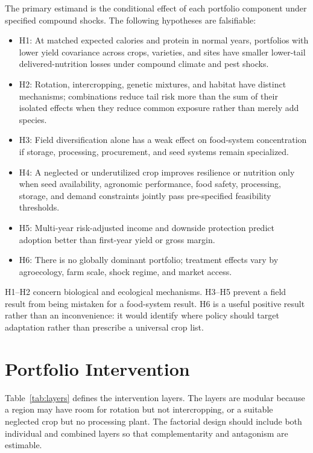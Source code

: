 \documentclass[conference]{IEEEtran}
\begin{document}
The primary estimand is the conditional effect of each portfolio component under specified compound shocks. The following hypotheses are falsifiable:

\begin{itemize}
\item H1: At matched expected calories and protein in normal years, portfolios with lower yield covariance across crops, varieties, and sites have smaller lower-tail delivered-nutrition losses under compound climate and pest shocks.
\item H2: Rotation, intercropping, genetic mixtures, and habitat have distinct mechanisms; combinations reduce tail risk more than the sum of their isolated effects when they reduce common exposure rather than merely add species.
\item H3: Field diversification alone has a weak effect on food-system concentration if storage, processing, procurement, and seed systems remain specialized.
\item H4: A neglected or underutilized crop improves resilience or nutrition only when seed availability, agronomic performance, food safety, processing, storage, and demand constraints jointly pass pre-specified feasibility thresholds.
\item H5: Multi-year risk-adjusted income and downside protection predict adoption better than first-year yield or gross margin.
\item H6: There is no globally dominant portfolio; treatment effects vary by agroecology, farm scale, shock regime, and market access.
\end{itemize}

H1--H2 concern biological and ecological mechanisms. H3--H5 prevent a field result from being mistaken for a food-system result. H6 is a useful positive result rather than an inconvenience: it would identify where policy should target adaptation rather than prescribe a universal crop list.

\section{Portfolio Intervention}
\label{sec:portfolio}
Table~\ref{tab:layers} defines the intervention layers. The layers are modular because a region may have room for rotation but not intercropping, or a suitable neglected crop but no processing plant. The factorial design should include both individual and combined layers so that complementarity and antagonism are estimable.
\end{document}
